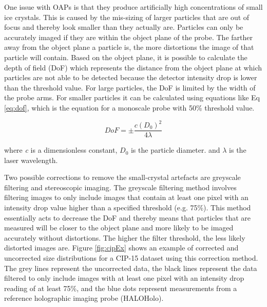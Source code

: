 One issue with OAPs is that they produce artificially high concentrations of small ice crystals. This is caused by the mis-sizing of larger particles that are out of focus and thereby look smaller than they actually are. Particles can only be accurately imaged if they are within the object plane of the probe. The farther away from the object plane a particle is, the more distortions the image of that particle will contain. Based on the object plane, it is possible to calculate the depth of field (DoF) which represents the distance from the object plane at which particles are not able to be detected because the detector intensity drop is lower than the threshold value. For large particles, the DoF is limited by the width of the probe arms. For smaller particles it can be calculated using equations like Eq \ref{eq:dof}, which is the equation for a monoscale probe with 50\% threshold value. \citep{oshea2021}

\begin{equation} \label{eq:dof}
DoF = \pm \frac{c (D_0)^2}{4\lambda}
\end{equation}

where \textit{c} is a dimensionless constant, $D_0$ is the particle diameter. and $\lambda$ is the laser wavelength.

Two possible corrections to remove the small-crystal artefacts are greyscale filtering and stereoscopic imaging. The greyscale filtering method involves filtering images to only include images that contain at least one pixel with an intensity drop value higher than a specified threshold (e.g. 75\%). This method essentially acts to decrease the DoF and thereby means that particles that are measured will be closer to the object plane and more likely to be imaged accurately without distortions. The higher the filter threshold, the less likely distorted images are. Figure \ref{fig:cipEx} shows an example of corrected and uncorrected size distributions for a CIP-15 dataset using this correction method. The grey lines represent the uncorrected data, the black lines represent the data filtered to only include images with at least one pixel with an intensity drop reading of at least 75\%, and the blue dots represent measurements from a reference holographic imaging probe (HALOHolo). \citep{oshea2021}

